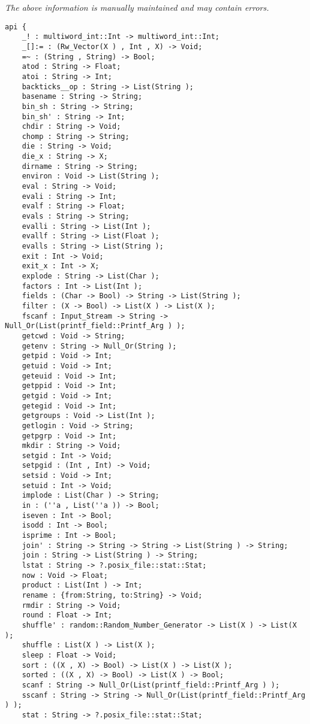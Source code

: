 \label{pkg:scripting\_globals}

{\tiny \it The above information is manually maintained and may contain errors.}
\begin{verbatim}
api {
    _! : multiword_int::Int -> multiword_int::Int;
    _[]:= : (Rw_Vector(X ) , Int , X) -> Void;
    =~ : (String , String) -> Bool;
    atod : String -> Float;
    atoi : String -> Int;
    backticks__op : String -> List(String );
    basename : String -> String;
    bin_sh : String -> String;
    bin_sh' : String -> Int;
    chdir : String -> Void;
    chomp : String -> String;
    die : String -> Void;
    die_x : String -> X;
    dirname : String -> String;
    environ : Void -> List(String );
    eval : String -> Void;
    evali : String -> Int;
    evalf : String -> Float;
    evals : String -> String;
    evalli : String -> List(Int );
    evallf : String -> List(Float );
    evalls : String -> List(String );
    exit : Int -> Void;
    exit_x : Int -> X;
    explode : String -> List(Char );
    factors : Int -> List(Int );
    fields : (Char -> Bool) -> String -> List(String );
    filter : (X -> Bool) -> List(X ) -> List(X );
    fscanf : Input_Stream -> String -> Null_Or(List(printf_field::Printf_Arg ) );
    getcwd : Void -> String;
    getenv : String -> Null_Or(String );
    getpid : Void -> Int;
    getuid : Void -> Int;
    geteuid : Void -> Int;
    getppid : Void -> Int;
    getgid : Void -> Int;
    getegid : Void -> Int;
    getgroups : Void -> List(Int );
    getlogin : Void -> String;
    getpgrp : Void -> Int;
    mkdir : String -> Void;
    setgid : Int -> Void;
    setpgid : (Int , Int) -> Void;
    setsid : Void -> Int;
    setuid : Int -> Void;
    implode : List(Char ) -> String;
    in : (''a , List(''a )) -> Bool;
    iseven : Int -> Bool;
    isodd : Int -> Bool;
    isprime : Int -> Bool;
    join' : String -> String -> String -> List(String ) -> String;
    join : String -> List(String ) -> String;
    lstat : String -> ?.posix_file::stat::Stat;
    now : Void -> Float;
    product : List(Int ) -> Int;
    rename : {from:String, to:String} -> Void;
    rmdir : String -> Void;
    round : Float -> Int;
    shuffle' : random::Random_Number_Generator -> List(X ) -> List(X );
    shuffle : List(X ) -> List(X );
    sleep : Float -> Void;
    sort : ((X , X) -> Bool) -> List(X ) -> List(X );
    sorted : ((X , X) -> Bool) -> List(X ) -> Bool;
    scanf : String -> Null_Or(List(printf_field::Printf_Arg ) );
    sscanf : String -> String -> Null_Or(List(printf_field::Printf_Arg ) );
    stat : String -> ?.posix_file::stat::Stat;

\end{verbatim}
